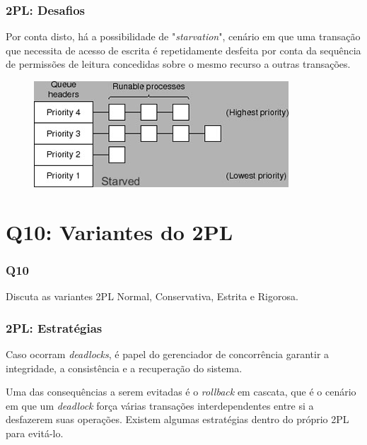 \documentclass{beamer}
\begin{document}
\begin{frame} %
    \frametitle{2PL: Desafios}
    Por conta disto, há a possibilidade de "\emph{starvation}", cenário em que uma transação que necessita de acesso de escrita é repetidamente desfeita por conta da sequência de permissões de leitura concedidas sobre o mesmo recurso a outras transações.

    \medskip
    \begin{figure}
        \includegraphics[width=0.8\linewidth]{starvation.jpg}
    \end{figure}
\end{frame}

\section{Q10: Variantes do 2PL}

\begin{frame}
    \frametitle{Q10}

    Discuta as variantes 2PL Normal, Conservativa, Estrita e Rigorosa.

\end{frame}

\begin{frame} %
    \frametitle{2PL: Estratégias}
    
    Caso ocorram \emph{deadlocks}, é papel do gerenciador de concorrência garantir a integridade, a consistência e a recuperação do sistema.
    
    \medskip
    Uma das consequências a serem evitadas é o \emph{rollback} em cascata, que é o cenário em que um \emph{deadlock} força várias transações interdependentes entre si a desfazerem suas operações. Existem algumas estratégias dentro do próprio 2PL para evitá-lo.
\end{frame}
\end{document}
